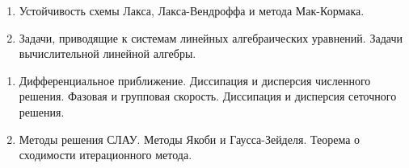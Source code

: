 \documentclass[14pt,a4paper]{extarticle}
\begin{document}

    \begin{enumerate}

         \item Устойчивость схемы Лакса, Лакса-Вендроффа и метода Мак-Кормака.

         \item Задачи, приводящие к системам линейных алгебраических уравнений. Задачи вычислительной линейной алгебры.

    \end{enumerate}


    \begin{enumerate}

         \item Дифференциальное приближение. Диссипация и дисперсия численного решения. Фазовая и групповая скорость. Диссипация и дисперсия сеточного решения.

         \item Методы решения СЛАУ. Методы Якоби и Гаусса-Зейделя. Теорема о сходимости итерационного метода.

    \end{enumerate}
\end{document}
